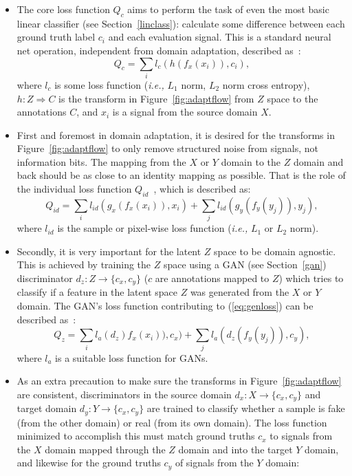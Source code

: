 \begin{itemize}
\item The core loss function $Q_c$ aims to perform the task of even the most basic linear classifier (see Section~\ref{linclass}): calculate some difference between each ground truth label $c_i$ and each evaluation signal. This is a standard neural net operation, independent from domain adaptation, described as~\cite{dadaptadversarial}:
\begin{equation}
\label{eq:qc}
Q_c = \sum_i l_c (h(f_x(x_i)),c_i),
\end{equation}
where $l_c$ is some loss function (\textit{i.e.,} $L_1$ norm, $L_2$ norm cross entropy), $h : Z \Rightarrow C$ is the transform in Figure~\ref{fig:adaptflow} from $Z$ space to the annotations $C$, and $x_i$ is a signal from the source domain $X$.
\item First and foremost in domain adaptation, it is desired for the transforms in Figure~\ref{fig:adaptflow} to only remove structured noise from signals, not information bits. The mapping from the $X$ or $Y$ domain to the $Z$ domain and back should be as close to an identity mapping as possible. That is the role of the individual loss function $Q_{id}$~\cite{drcn}, which is described as:
\begin{equation}
\label{eq:qid}
Q_{id} = \sum_i l_{id}(g_x(f_x(x_i)),x_i)+\sum_j l_{id}(g_y(f_y(y_j)),y_j),
\end{equation}
where $l_{id}$ is the sample or pixel-wise loss function (\textit{i.e.,} $L_1$ or $L_2$ norm).
\item Secondly, it is very important for the latent $Z$ space to be domain agnostic. This is achieved by training the $Z$ space using a GAN (see Section~\ref{gan}) discriminator $d_z : Z \rightarrow \{c_x,c_y \}$ ($c$ are annotations mapped to $Z$) which tries to classify if a feature in the latent space $Z$ was generated from the $X$ or $Y$ domain. The GAN's loss function contributing to (\ref{eq:genloss}) can be described as~\cite{dadaptagnostic}:
\begin{equation}
\label{eq:qz}
Q_z = \sum_i l_a(d_z)f_x(x_i)),c_x)+\sum_j l_a(d_z(f_y(y_j)),c_y),
\end{equation}
where $l_a$ is a suitable loss function for GANs.
\item As an extra precaution to make sure the transforms in Figure~\ref{fig:adaptflow} are consistent, discriminators in the source domain $d_x : X \rightarrow \{c_x,c_y \}$ and target domain $d_y : Y \rightarrow \{c_x,c_y \}$ are trained\cite{dadaptcyc} to classify whether a sample is fake (from the other domain) or real (from its own domain). The loss function minimized to accomplish this must match ground truths $c_x$ to signals from the $X$ domain mapped through the $Z$ domain and into the target $Y$ domain, and likewise for the ground truths $c_y$ of signals from the $Y$ domain:

\end{itemize}
